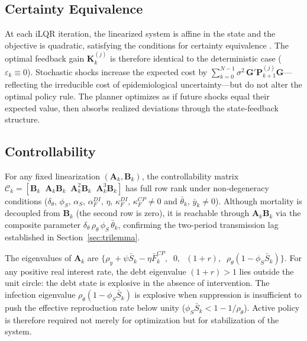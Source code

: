 \subsection{Certainty Equivalence}
\label{sec:ce}

At each iLQR iteration, the linearized system is affine in the state and the
objective is quadratic, satisfying the conditions for certainty equivalence
\citep[Chapter~3.1]{bertsekas2017dynamic}. The optimal feedback gain $\bm{K}_k^{(j)}$
is therefore identical to the deterministic case ($\varepsilon_k \equiv 0$).
Stochastic shocks increase the expected cost by
$\sum_{k=0}^{N-1} \sigma^2\, \bm{G}'\bm{P}_{k+1}^{(j)}\bm{G}$---reflecting the
irreducible cost of epidemiological uncertainty---but do not alter the optimal policy
rule. The planner optimizes as if future shocks equal their expected value, then
absorbs realized deviations through the state-feedback structure.


\subsection{Controllability}
\label{sec:controllability}

For any fixed linearization $(\bm{A}_k, \bm{B}_k)$, the controllability matrix
$\mathcal{C}_k = [\bm{B}_k \;\; \bm{A}_k\bm{B}_k \;\;
\bm{A}_k^2\bm{B}_k \;\; \bm{A}_k^3\bm{B}_k]$ has full row rank under
non-degeneracy conditions ($\delta_\theta,\, \phi_S,\, \alpha_S,\, \alpha_F^{DI},\,
\eta,\, \kappa_F^{DI},\, \kappa_F^{CP} \neq 0$ and $\bar{\theta}_k,\,
\bar{y}_k \neq 0$). Although mortality is decoupled from $\bm{B}_k$ (the second row
is zero), it is reachable through $\bm{A}_k\bm{B}_k$ via the composite parameter
$\delta_\theta\,\rho_\theta\,\phi_S\,\bar{\theta}_k$, confirming the two-period
transmission lag established in Section~\ref{sec:trilemma}.

The eigenvalues of $\bm{A}_k$ are
$\bigl\{\rho_y + \psi\bar{S}_k - \eta\bar{F}_k^{CP},\;\; 0,\;\; (1+r),\;\;
\rho_\theta(1-\phi_S\bar{S}_k)\bigr\}$. For any positive real interest rate, the
debt eigenvalue $(1+r) > 1$ lies outside the unit circle: the debt state is explosive
in the absence of intervention. The infection eigenvalue
$\rho_\theta(1-\phi_S\bar{S}_k)$ is explosive when suppression is insufficient to
push the effective reproduction rate below unity
($\phi_S \bar{S}_k < 1 - 1/\rho_\theta$). Active policy is therefore required not
merely for optimization but for stabilization of the system.




